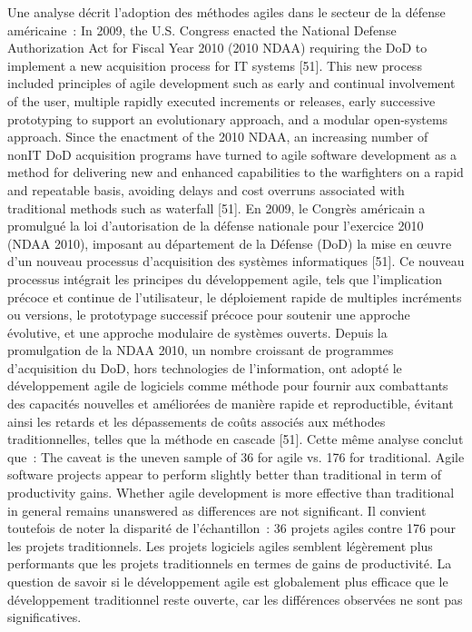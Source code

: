 {Une analyse décrit l'adoption des méthodes agiles dans le secteur de la défense américaine~:
\quoteenfr
{In 2009, the U.S. Congress enacted the National Defense Authorization Act for Fiscal Year 2010 (2010 NDAA) requiring the DoD to implement a new acquisition process for IT systems [51]. This new process included principles of agile development such as early and continual involvement of the user, multiple rapidly executed increments or releases, early successive prototyping to support an evolutionary approach, and a modular open-systems approach. Since the enactment of the 2010 NDAA, an increasing number of nonIT DoD acquisition programs have turned to agile software development as a method for delivering new and enhanced capabilities to the warfighters on a rapid and repeatable basis, avoiding delays and cost overruns associated with traditional methods such as waterfall [51].}
{En 2009, le Congrès américain a promulgué la loi d'autorisation de la défense nationale pour l'exercice 2010 (NDAA 2010), imposant au département de la Défense (DoD) la mise en œuvre d'un nouveau processus d'acquisition des systèmes informatiques [51]. Ce nouveau processus intégrait les principes du développement agile, tels que l'implication précoce et continue de l'utilisateur, le déploiement rapide de multiples incréments ou versions, le prototypage successif précoce pour soutenir une approche évolutive, et une approche modulaire de systèmes ouverts. Depuis la promulgation de la NDAA 2010, un nombre croissant de programmes d'acquisition du DoD, hors technologies de l'information, ont adopté le développement agile de logiciels comme méthode pour fournir aux combattants des capacités nouvelles et améliorées de manière rapide et reproductible, évitant ainsi les retards et les dépassements de coûts associés aux méthodes traditionnelles, telles que la méthode en cascade [51].}
{\cite{rosa_empirical_2022}}
Cette même analyse conclut que~:
\quoteenfr
{The caveat is the uneven sample of 36 for agile vs. 176 for traditional. \elide
Agile software projects appear to perform slightly better than traditional in term of productivity gains. \elide Whether agile development is more effective than traditional in general remains unanswered as differences are not significant.}
{Il convient toutefois de noter la disparité de l'échantillon~: 36 projets agiles contre 176 pour les projets traditionnels.
\elide
Les projets logiciels agiles semblent légèrement plus performants que les projets traditionnels en termes de gains de productivité. \elide La question de savoir si le développement agile est globalement plus efficace que le développement traditionnel reste ouverte, car les différences observées ne sont pas significatives.}
{\cite{rosa_empirical_2022}}
\vspace{-1\baselineskip}
}{}

